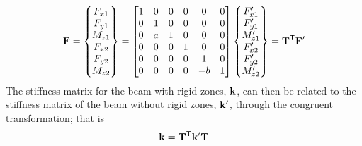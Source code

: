\begin{example}
\begin{equation*}
  \mathbf{F} = \begin{Bmatrix}F_{x1}\\ F_{y1}\\ M_{z1}\\ F_{x2}\\ F_{y2}\\ M_{z2}\end{Bmatrix} =
  \begin{bmatrix}1 & 0 & 0 & 0 & 0 & 0\\ 0 & 1 & 0 & 0 & 0 & 0\\ 0 & a & 1 & 0 & 0 & 0\\ 0 & 0 & 0 & 1 & 0 & 0\\ 0 & 0 & 0 & 0 & 1 & 0\\ 0 & 0 & 0 & 0 & -b & 1\end{bmatrix}
  \begin{Bmatrix}F_{x1}'\\ F_{y1}'\\ M_{z1}'\\ F_{x2}'\\ F_{y2}'\\ M_{z2}'\end{Bmatrix} = \mathbf{T}^{\mathsf{T}}\mathbf{F}'
\end{equation*}
The stiffness matrix for the beam with rigid zones, $\mathbf{k}$, can then be related to the stiffness matrix of the beam without rigid zones, $\mathbf{k}'$, through the congruent transformation; that is
\begin{equation*}
  \mathbf{k} = \mathbf{T}^{\mathsf{T}}\mathbf{k}'\mathbf{T}
\end{equation*}
\end{example}

